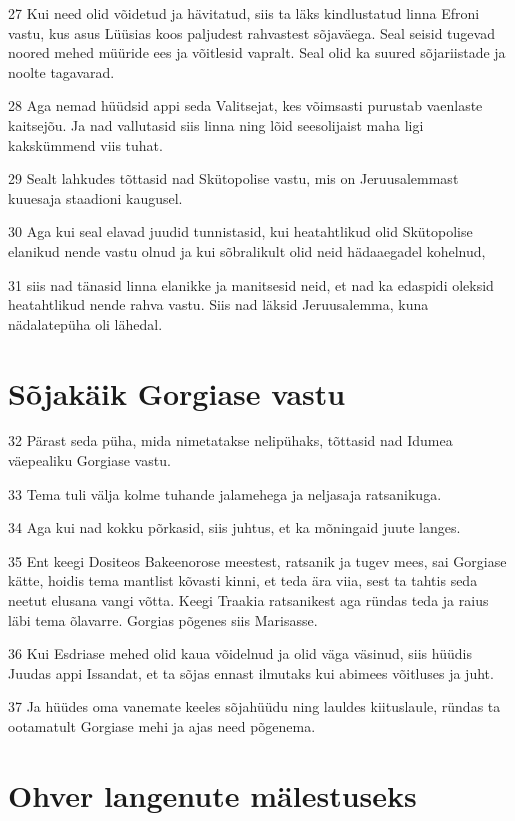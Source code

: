 \par 27 Kui need olid võidetud ja hävitatud, siis ta läks kindlustatud linna Efroni vastu, kus asus Lüüsias koos paljudest rahvastest sõjaväega. Seal seisid tugevad noored mehed müüride ees ja võitlesid vapralt. Seal olid ka suured sõjariistade ja noolte tagavarad.
\par 28 Aga nemad hüüdsid appi seda Valitsejat, kes võimsasti purustab vaenlaste kaitsejõu. Ja nad vallutasid siis linna ning lõid seesolijaist maha ligi kakskümmend viis tuhat.
\par 29 Sealt lahkudes tõttasid nad Skütopolise vastu, mis on Jeruusalemmast kuuesaja staadioni kaugusel.
\par 30 Aga kui seal elavad juudid tunnistasid, kui heatahtlikud olid Skütopolise elanikud nende vastu olnud ja kui sõbralikult olid neid hädaaegadel kohelnud,
\par 31 siis nad tänasid linna elanikke ja manitsesid neid, et nad ka edaspidi oleksid heatahtlikud nende rahva vastu. Siis nad läksid Jeruusalemma, kuna nädalatepüha oli lähedal.


\section*{Sõjakäik Gorgiase vastu}

\par 32 Pärast seda püha, mida nimetatakse nelipühaks, tõttasid nad Idumea väepealiku Gorgiase vastu.
\par 33 Tema tuli välja kolme tuhande jalamehega ja neljasaja ratsanikuga.
\par 34 Aga kui nad kokku põrkasid, siis juhtus, et ka mõningaid juute langes.
\par 35 Ent keegi Dositeos Bakeenorose meestest, ratsanik ja tugev mees, sai Gorgiase kätte, hoidis tema mantlist kõvasti kinni, et teda ära viia, sest ta tahtis seda neetut elusana vangi võtta. Keegi Traakia ratsanikest aga ründas teda ja raius läbi tema õlavarre. Gorgias põgenes siis Marisasse.
\par 36 Kui Esdriase mehed olid kaua võidelnud ja olid väga väsinud, siis hüüdis Juudas appi Issandat, et ta sõjas ennast ilmutaks kui abimees võitluses ja juht.
\par 37 Ja hüüdes oma vanemate keeles sõjahüüdu ning lauldes kiituslaule, ründas ta ootamatult Gorgiase mehi ja ajas need põgenema.


\section*{Ohver langenute mälestuseks}

